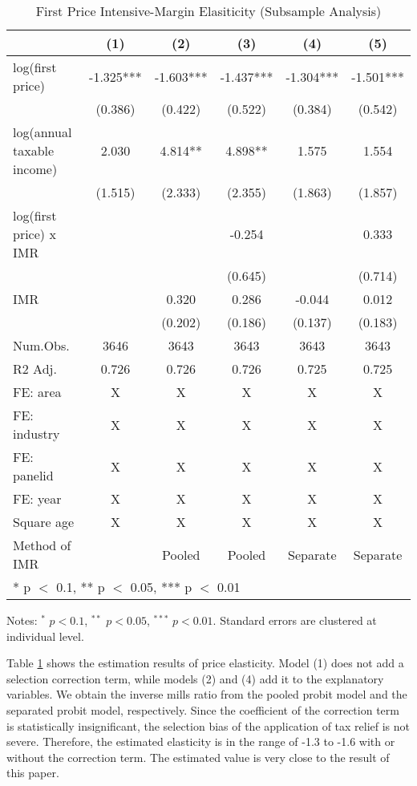 \documentclass[
  11pt,
  a4paper,
]{article}
\begin{document}
\begin{table}

\caption{\label{tab:benchmark}First Price Intensive-Margin Elasiticity (Subsample Analysis)}
\centering
\fontsize{9}{11}\selectfont
\begin{threeparttable}
\begin{tabular}[t]{lccccc}
\toprule
  & (1) & (2) & (3) & (4) & (5)\\
\midrule
log(first price) & -1.325*** & -1.603*** & -1.437*** & -1.304*** & -1.501***\\
 & (0.386) & (0.422) & (0.522) & (0.384) & (0.542)\\
log(annual taxable income) & 2.030 & 4.814** & 4.898** & 1.575 & 1.554\\
 & (1.515) & (2.333) & (2.355) & (1.863) & (1.857)\\
log(first price) x IMR &  &  & -0.254 &  & 0.333\\
 &  &  & (0.645) &  & (0.714)\\
IMR &  & 0.320 & 0.286 & -0.044 & 0.012\\
 &  & (0.202) & (0.186) & (0.137) & (0.183)\\
\midrule
Num.Obs. & 3646 & 3643 & 3643 & 3643 & 3643\\
R2 Adj. & 0.726 & 0.726 & 0.726 & 0.725 & 0.725\\
FE: area & X & X & X & X & X\\
FE: industry & X & X & X & X & X\\
FE: panelid & X & X & X & X & X\\
FE: year & X & X & X & X & X\\
Square age & X & X & X & X & X\\
Method of IMR &  & Pooled & Pooled & Separate & Separate\\
\bottomrule
\multicolumn{6}{l}{\rule{0pt}{1em}* p $<$ 0.1, ** p $<$ 0.05, *** p $<$ 0.01}\\
\end{tabular}
\begin{tablenotes}
\item Notes: $^{*}$ $p < 0.1$, $^{**}$ $p < 0.05$, $^{***}$ $p < 0.01$. Standard errors are clustered at individual level.
\end{tablenotes}
\end{threeparttable}
\end{table}

Table \ref{tab:benchmark} shows the estimation results of price elasticity.
Model (1) does not add a selection correction term,
while models (2) and (4) add it to the explanatory variables.
We obtain the inverse mills ratio from the pooled probit model
and the separated probit model, respectively.
Since the coefficient of the correction term is statistically insignificant,
the selection bias of the application of tax relief is not severe.
Therefore, the estimated elasticity is in the range of -1.3 to -1.6
with or without the correction term.
The estimated value is very close to the result of this paper.
\end{document}
